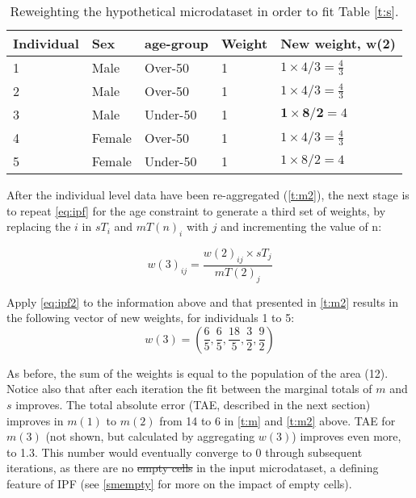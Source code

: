 \documentclass[a4paper,10pt]{article}
\providecommand{\DIFaddtex}[1]{{\protect\color{blue}\uwave{#1}}} %
\providecommand{\DIFdeltex}[1]{{\protect\color{red}\sout{#1}}}                      %
\providecommand{\DIFaddbegin}{} %
\providecommand{\DIFaddend}{} %
\providecommand{\DIFdelbegin}{} %
\providecommand{\DIFdelend}{} %
\providecommand{\DIFadd}[1]{\texorpdfstring{\DIFaddtex{#1}}{#1}} %
\providecommand{\DIFdel}[1]{\texorpdfstring{\DIFdeltex{#1}}{}} %
\begin{document}
\begin{table}[htbp]
\caption{Reweighting the hypothetical microdataset in order to fit
Table \ref{t:s}.}

\begin{center}
\begin{tabular}{lllll}
\toprule
{Individual} & {Sex} & {age-group} & {Weight} &
{New weight, w(2)} \\ \midrule
1 & Male & Over-50 & 1 & $1 \times 4/3 = \frac{4}{3}$ \\
2 & Male & Over-50 & 1 & $1 \times 4/3 = \frac{4}{3}$ \\
3 & Male & Under-50 & 1 & $\textbf{1} \times
\textbf{8}/\textbf{2} = 4$ \\
4 & Female & Over-50 & 1 & $1 \times 4/3 = \frac{4}{3}$ \\
5 & Female & Under-50 & 1 & $1 \times 8/2 = 4$ \\
\bottomrule
\end{tabular}
\end{center}
\label{t:new-weights}
\end{table}

\FloatBarrier

After the individual level data have been re-aggregated (\cref{t:m2}),
the next stage is to repeat \cref{eq:ipf} for the age constraint to generate a
third set of weights, by replacing
the $i$ in $sT_{i}$ and $mT(n)_{i}$ with $j$ and incrementing the value of n:

\begin{equation}
w(3)_{ij} = \frac{w(2)_{ij} \times sT_{j}}{mT(2)_{j}}
\label{eq:ipf2}
\end{equation}

Apply \cref{eq:ipf2} to the information above and that presented in \cref{t:m2}
results in the following vector of new weights, for individuals 1 to 5:
\begin{equation}
  w(3) = (\frac{6}{5}, \frac{6}{5}, \frac{18}{5}, \frac{3}{2}, \frac{9}{2})
\end{equation}

\FloatBarrier

As before, the sum of the weights is equal to the population of the area (12).
Notice also that after each iteration the fit between the marginal
totals of $m$ and $s$
improves. The total absolute error (TAE, described in the next section)
improves in $m(1)$ to $m(2)$ from
14 to 6 in \cref{t:m} and \cref{t:m2} above. TAE for $m(3)$ (not shown,
but calculated by aggregating $w(3)$) improves even more, to 1.3.
This number would eventually converge to 0 through subsequent
iterations, as there are no \DIFdelbegin \DIFdel{empty cells }\DIFdelend \DIFaddbegin \DIFadd{`empty cells' \mbox{%
\citep{Wong1992}
}%
}\DIFaddend in the input microdataset,
a defining feature of IPF (see \cref{smempty} for more on the impact of empty cells).
\end{document}
